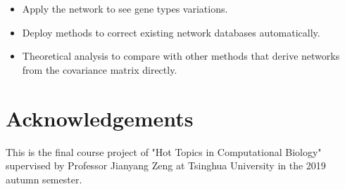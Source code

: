 \documentclass{bioinfo}
\begin{document}
\begin{itemize}
    \item Apply the network to see gene types variations.
    \item Deploy methods to correct existing network databases automatically.
    \item Theoretical analysis to compare with other methods that derive networks from the covariance matrix directly.
\end{itemize}




%
%

% 

\section*{Acknowledgements}

This is the final course project of "Hot Topics in Computational Biology" supervised by Professor Jianyang Zeng at Tsinghua University in the 2019 autumn semester.










\nocite{*}

\end{document}
